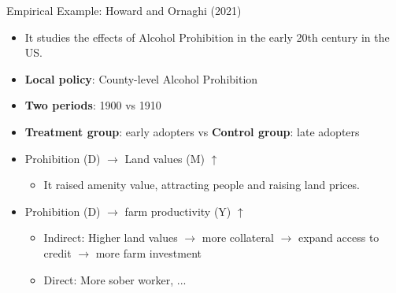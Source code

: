 \documentclass[aspectratio=1610, 9pt]{beamer}
\begin{document}
\begin{frame}{Empirical Example: Howard and Ornaghi (2021)}
\begin{itemize}
    \item  It studies the effects of Alcohol Prohibition in the early 20th century in the US.
    \vspace{0.1cm}
    \item \textbf{Local policy}: County-level Alcohol Prohibition
     \vspace{0.1cm}
     \item \textbf{Two periods}: 1900 vs 1910
          \vspace{0.1cm}
    \item \textbf{Treatment group}: early adopters vs \textbf{Control group}: late adopters
     \vspace{0.1cm}
    \item Prohibition (D) $\rightarrow$ Land values (M) $\uparrow$
    \begin{itemize}
\item[-] It raised amenity value, attracting people and raising land prices.
    \end{itemize}
     \vspace{0.1cm}
    \item Prohibition (D) $\rightarrow$ farm productivity (Y) $\uparrow$
    \begin{itemize}
    \item[-] Indirect: Higher land values $\rightarrow$ more collateral $\rightarrow$ expand access to credit $\rightarrow$ more farm investment
        \item[-] Direct: More sober worker, ...
    \end{itemize}

\end{itemize}

\vspace{0.3cm}

\centering
\begin{tikzpicture}[x=0.45pt,y=0.45pt,yscale=-1,xscale=1]


\end{tikzpicture}
\end{frame}
\end{document}
